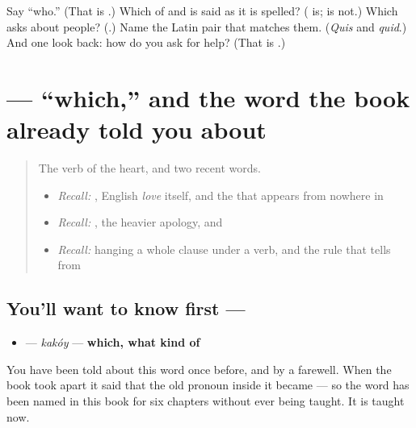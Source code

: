 \begin{tcolorbox}[breakable,colback=teal!4,colframe=teal!35!black,title={Before you move on}]
Say \textquotedblleft{}who.\textquotedblright{} (That is \textbf{}.) Which of \textbf{} and \textbf{} is said as it is spelled? (\textbf{} is; \textbf{} is not.) Which asks about people? (\textbf{}.) Name the Latin pair that matches them. (\emph{Quis} and \emph{quid}.) And one look back: how do you ask for help? (That is \textbf{}.)
\end{tcolorbox}
\section[\texorpdfstring{\ru{какой} (kakóy)}{какой (kakóy)}]{ — \textquotedblleft{}which,\textquotedblright{} and the word the book already told you about}

\label{lesson:RU-C22-kakoy}



\begin{quote}
The verb of the heart, and two recent words.

\begin{itemize}
\raggedright
  \item \emph{Recall:} \emph{}, English \emph{love} itself, and the \textbf{} that appears from nowhere in \emph{ }
  \item \emph{Recall:} \emph{}, the heavier apology, and \emph{}
  \item \emph{Recall:} \emph{} hanging a whole clause under a verb, and the rule that tells \emph{} from \emph{}
\end{itemize}
\end{quote}

\subsection*{You'll want to know first — }
\begin{itemize}
\raggedright
  \item \textbf{} — \emph{kakóy} — \textbf{which, what kind of}
\end{itemize}

You have been told about this word once before, and by a farewell. When the book took \textbf{} apart it said that the old pronoun inside it became \textbf{} — so the word has been named in this book for six chapters without ever being taught. It is taught now.

